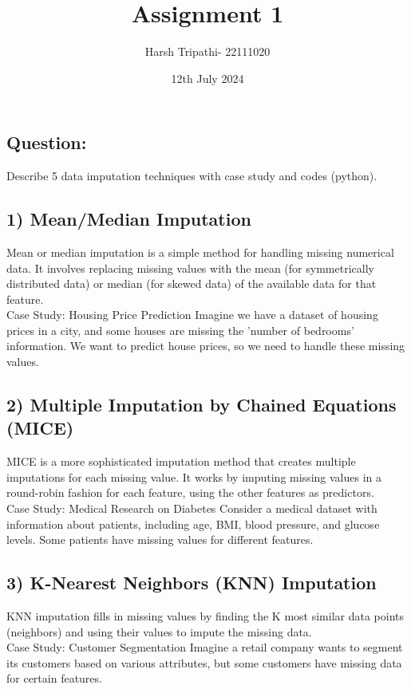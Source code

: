\documentclass{article}
\title{Assignment 1}
\author{Harsh Tripathi- 22111020}
\date{12th July 2024}
\begin{document}
\maketitle

\subsection*{Question:}
Describe 5 data imputation techniques with case study and codes (python).
\\

\subsection*{1) Mean/Median Imputation}
Mean or median imputation is a simple method for handling missing numerical data. It involves replacing missing values with the mean (for symmetrically distributed data) or median (for skewed data) of the available data for that feature.
\\
Case Study: Housing Price Prediction
Imagine we have a dataset of housing prices in a city, and some houses are missing the 'number of bedrooms' information. We want to predict house prices, so we need to handle these missing values.
\\

\subsection*{2) Multiple Imputation by Chained Equations (MICE)}
MICE is a more sophisticated imputation method that creates multiple imputations for each missing value. It works by imputing missing values in a round-robin fashion for each feature, using the other features as predictors.
\\
Case Study: Medical Research on Diabetes
Consider a medical dataset with information about patients, including age, BMI, blood pressure, and glucose levels. Some patients have missing values for different features.
\\

\subsection*{3) K-Nearest Neighbors (KNN) Imputation}
KNN imputation fills in missing values by finding the K most similar data points (neighbors) and using their values to impute the missing data.
\\
Case Study: Customer Segmentation
Imagine a retail company wants to segment its customers based on various attributes, but some customers have missing data for certain features.
\\
\end{document}
